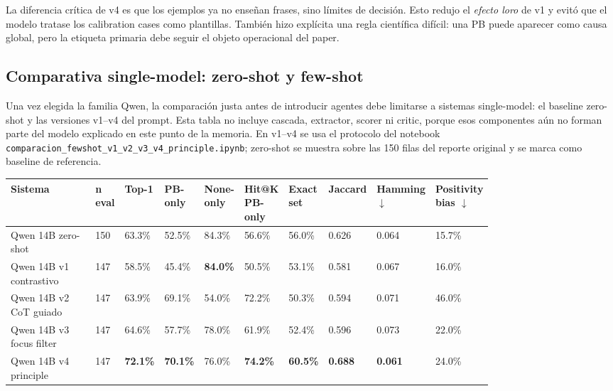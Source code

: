 La diferencia crítica de v4 es que los ejemplos ya no enseñan frases, sino límites de decisión. Esto redujo el \emph{efecto loro} de v1 y evitó que el modelo tratase los calibration cases como plantillas. También hizo explícita una regla científica difícil: una PB puede aparecer como causa global, pero la etiqueta primaria debe seguir el objeto operacional del paper.

\subsection{Comparativa single-model: zero-shot y few-shot}

Una vez elegida la familia Qwen, la comparación justa antes de introducir agentes debe limitarse a sistemas single-model: el baseline zero-shot y las versiones v1--v4 del prompt. Esta tabla no incluye cascada, extractor, scorer ni critic, porque esos componentes aún no forman parte del modelo explicado en este punto de la memoria. En v1--v4 se usa el protocolo del notebook \texttt{comparacion\_fewshot\_v1\_v2\_v3\_v4\_principle.ipynb}; zero-shot se muestra sobre las 150 filas del reporte original y se marca como baseline de referencia.

\begin{center}
\scriptsize
\setlength{\tabcolsep}{3pt}
\renewcommand{\arraystretch}{1.15}
\begin{tabular}{p{0.22\linewidth}p{0.05\linewidth}p{0.065\linewidth}p{0.065\linewidth}p{0.065\linewidth}p{0.065\linewidth}p{0.065\linewidth}p{0.065\linewidth}p{0.065\linewidth}p{0.065\linewidth}}
\toprule
Sistema & n eval & Top-1 & PB-only & None-only & Hit@K PB-only & Exact set & Jaccard & Hamming $\downarrow$ & Positivity bias $\downarrow$ \\
\midrule
Qwen 14B zero-shot & 150 & 63.3\% & 52.5\% & 84.3\% & 56.6\% & 56.0\% & 0.626 & 0.064 & 15.7\% \\
Qwen 14B v1 contrastivo & 147 & 58.5\% & 45.4\% & \textbf{84.0\%} & 50.5\% & 53.1\% & 0.581 & 0.067 & 16.0\% \\
Qwen 14B v2 CoT guiado & 147 & 63.9\% & 69.1\% & 54.0\% & 72.2\% & 50.3\% & 0.594 & 0.071 & 46.0\% \\
Qwen 14B v3 focus filter & 147 & 64.6\% & 57.7\% & 78.0\% & 61.9\% & 52.4\% & 0.596 & 0.073 & 22.0\% \\
Qwen 14B v4 principle & 147 & \textbf{72.1\%} & \textbf{70.1\%} & 76.0\% & \textbf{74.2\%} & \textbf{60.5\%} & \textbf{0.688} & \textbf{0.061} & 24.0\% \\
\bottomrule
\end{tabular}
\end{center}

